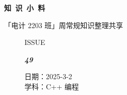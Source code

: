 \documentclass[UTF8]{ctexart}
\newcommand\Black[1]{\textcolor[gray]{0.3}{#1}}
\newcommand\Brown[1]{\textcolor[HTML]{998A4E}{#1}}
\newcommand\IssueNumber{49}
\newcommand\Date{2025-3-2}
\newcommand\Subject{C++ 编程}
\begin{document}
\BgThispage
\begin{center}
\phantom{...}

{\Large\textcolor{brown!40!white}{}}

\vspace{-2em}

{\Huge\bfseries\TitleFont \Black{知\ 识\ 小\ 料}}


\vspace{-0.1cm}
{\footnotesize \Brown{「电计 2203 班」周常规知识整理共享}}
\end{center}

\vspace{-0.5cm}


\begin{figure}[H]
\hspace{1cm}
\begin{minipage}[t]{0.3\textwidth}
\centering
    \Brown{\Genshin ISSUE}

    \vspace{-0.6cm}
    \Huge \Issue\slshape\bfseries\Black{\IssueNumber}
\end{minipage}
\hfill
\begin{minipage}[t]{0.35\textwidth}
\centering
    \Brown{日期：\Date} \\
\vspace{-0.1cm}
    \Brown{学科：\Subject} \\
\end{minipage}
\hspace{0.8cm}
\end{figure}
\end{document}
